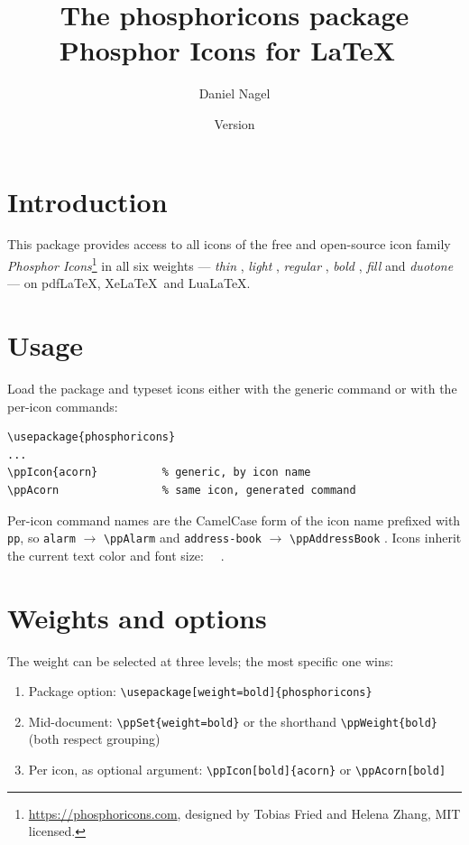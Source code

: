 \documentclass{article}
\title{The \textsf{phosphoricons} package\\
  \large Phosphor Icons for \LaTeX\ \ppIcon{flask}}
\author{Daniel Nagel}
\date{Version \ppversion}
\begin{document}
\maketitle

\section{Introduction}

This package provides access to all icons of the free and open-source icon
family \emph{Phosphor Icons}\footnote{\url{https://phosphoricons.com}, designed
by Tobias Fried and Helena Zhang, MIT licensed.} in all six weights ---
\emph{thin} , \emph{light} ,
\emph{regular} , \emph{bold} ,
\emph{fill}  and \emph{duotone}
 --- on pdf\LaTeX, Xe\LaTeX\ and Lua\LaTeX.

\section{Usage}

Load the package and typeset icons either with the generic command or with
the per-icon commands:

\begin{lstlisting}
\usepackage{phosphoricons}
...
\ppIcon{acorn}          % generic, by icon name
\ppAcorn                % same icon, generated command
\end{lstlisting}

Per-icon command names are the CamelCase form of the icon name prefixed with
\texttt{pp}, so \texttt{alarm} $\to$ \verb|\ppAlarm| \ppAlarm{} and
\texttt{address-book} $\to$ \verb|\ppAddressBook| \ppAddressBook.
Icons inherit the current text color and font size:
{\color{teal}\ppHeart[fill]}~~{\large{}}.

\section{Weights and options}

The weight can be selected at three levels; the most specific one wins:

\begin{enumerate}
  \item Package option: \verb|\usepackage[weight=bold]{phosphoricons}|
  \item Mid-document: \verb|\ppSet{weight=bold}| or the shorthand
    \verb|\ppWeight{bold}| (both respect grouping)
  \item Per icon, as optional argument: \verb|\ppIcon[bold]{acorn}| or
    \verb|\ppAcorn[bold]|
\end{enumerate}
\end{document}
